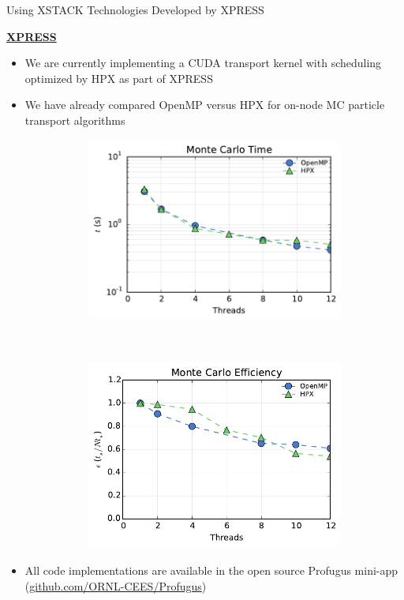 \documentclass{beamer}
\begin{document}
\begin{frame}{Using XSTACK Technologies Developed by XPRESS}

  \underline{\bf XPRESS}
  \begin{itemize}
    \setlength{\itemsep}{-0.1\baselineskip}
  \item We are currently implementing a CUDA transport kernel with scheduling
    optimized by HPX as part of XPRESS
  \item We have already compared OpenMP versus HPX for on-node MC particle
    transport algorithms
    \begin{figure}
      \begin{subfigure}{0.4\textwidth}
        \centering
        \includegraphics[width=\textwidth]{time}
      \end{subfigure}
      ~
      \begin{subfigure}{0.4\textwidth}
        \centering
        \includegraphics[width=\textwidth]{tallies}
      \end{subfigure}
    \end{figure}
  \item All code implementations are available in the open source Profugus
    mini-app (\underline{github.com/ORNL-CEES/Profugus})
  \end{itemize}

\end{frame}
\end{document}
